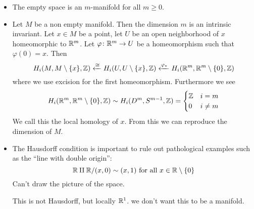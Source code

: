 \documentclass[language=english]{TemplateLecture}
\begin{document}
\begin{remark}
    \begin{itemize}
        \item The empty space is an \(m\)-manifold for all \(m \geq 0\).
        \item Let \(M\) be a non empty manifold. Then the dimension \(m\) is an intrinsic invariant. Let \(x \in M\) be a point, let \(U\) be an open neighborhood of \(x\) homeomorphic to \(\mathbb{R}^m\). Let \(\varphi\colon \mathbb{R}^m \to U\) be a homeomorphism such that \(\varphi(0) = x\). Then
        \[H_i(M, M \setminus \{x\}, \mathbb{Z}) \xleftarrow{\cong} H_i(U, U\setminus \{x\}, \mathbb{Z}) \xleftarrow{\varphi_*} H_i(\mathbb{R}^m, \mathbb{R}^m \setminus \{0\}, \mathbb{Z})\]
        where we use excision for the first homeomorphism. Furthermore we see
        \[H_i(\mathbb{R}^m, \mathbb{R}^m\setminus \{0\}, \mathbb{Z}) \sim H_i(D^m, S^{m-1}, \mathbb{Z}) = \begin{cases}
            \mathbb{Z} & i = m \\
            0 & i \neq m \\
        \end{cases}\]
        We call this the local homology of \(x\). From this we can reproduce the dimension of \(M\).
        \item The Hausdorff condition is important to rule out pathological examples such as the \enquote{line with double origin}:
        \[\mathbb{R} \amalg \mathbb{R}/(x,0)\sim (x,1) \text{ for all } x \in \mathbb{R} \setminus \{0\}\]
        Can't draw the picture of the space.

        This is not Hausdorff, but locally \(\mathbb{R}^1\). we don't want this to be a manifold.
    \end{itemize}
\end{remark}
\end{document}
